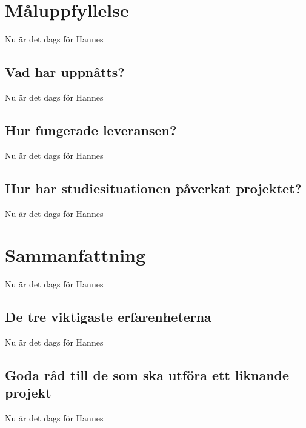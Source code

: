 \documentclass[a4paper,titlepage,12pt]{article}
\begin{document}
	
	\section{Måluppfyllelse}
	Nu är det dags för Hannes
	
	\subsection{Vad har uppnåtts?}
	Nu är det dags för Hannes
	
	\subsection{Hur fungerade leveransen?}
	Nu är det dags för Hannes
	
	\subsection{Hur har studiesituationen påverkat projektet?}
	Nu är det dags för Hannes
	
	\section{Sammanfattning}
	Nu är det dags för Hannes
	
	\subsection{De tre viktigaste erfarenheterna}
	Nu är det dags för Hannes
	
	\subsection{Goda råd till de som ska utföra ett liknande projekt}
	Nu är det dags för Hannes
	
\end{document}
